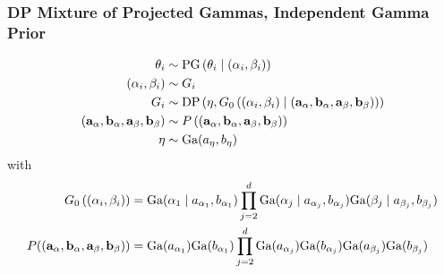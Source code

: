 \documentclass[aspectratio=169]{beamer}
\begin{document}
\begin{frame}
  \frametitle{DP Mixture of Projected Gammas, Independent Gamma Prior}
  \begin{equation*}
    \begin{aligned}
      \theta_i &\sim \text{PG}\left(\theta_i\mid ({\bf \alpha}_i, {\bf \beta}_i) \right)\\
      ({\bf \alpha}_i, {\bf \beta}_i) &\sim G_i\\
      G_i &\sim \text{DP}\left(\eta, G_0\left(({\bf \alpha}_i, {\bf \beta}_i)\mid ({\bf a}_{\alpha}, {\bf b}_{\alpha}, {\bf a}_{\beta}, {\bf b}_{\beta}) \right)\right)\\
       ({\bf a}_{\alpha}, {\bf b}_{\alpha}, {\bf a}_{\beta}, {\bf b}_{\beta}) &\sim P\left(({\bf a}_{\alpha}, {\bf b}_{\alpha}, {\bf a}_{\beta}, {\bf b}_{\beta})\right)\\
       \eta &\sim \text{Ga}(a_{\eta},b_{\eta})
    \end{aligned}
  \end{equation*}
  with
  \begin{equation*}
      \begin{aligned}
      G_0\left(({\bf \alpha}_i, {\bf \beta}_i)\right) &= \text{Ga}(\alpha_1\mid a_{\alpha_1},b_{\alpha_1})\prod_{j = 2}^d\text{Ga}(\alpha_j\mid a_{\alpha_j}, b_{\alpha_j})\text{Ga}(\beta_j\mid a_{\beta_j}, b_{\beta_j})\\
      P(({\bf a}_{\alpha}, {\bf b}_{\alpha}, {\bf a}_{\beta}, {\bf b}_{\beta})) &= \text{Ga}(a_{\alpha_1})\text{Ga}(b_{\alpha_1})\prod_{j = 2}^d\text{Ga}(a_{\alpha_j})\text{Ga}(b_{\alpha_j})\text{Ga}(a_{\beta_j})\text{Ga}(b_{\beta_j})
      \end{aligned}
  \end{equation*}
\end{frame}
\end{document}
